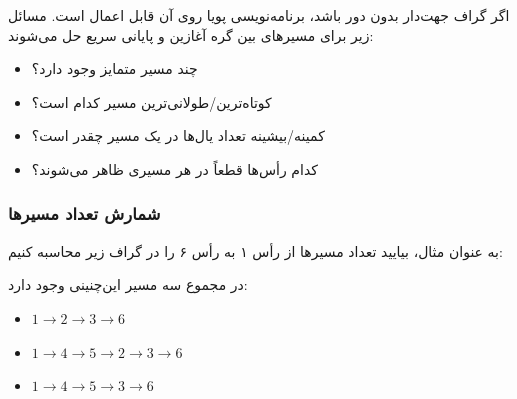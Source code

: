 اگر گراف جهت‌دار بدون دور باشد،
برنامه‌نویسی پویا روی آن قابل اعمال است.
مسائل زیر برای مسیرهای بین گره آغازین
و پایانی سریع حل می‌شوند:

\begin{itemize}
\item چند مسیر متمایز وجود دارد؟
\item کوتاه‌ترین/طولانی‌ترین مسیر کدام است؟
\item کمینه/بیشینه تعداد یال‌ها در یک مسیر چقدر است؟
\item کدام رأس‌ها قطعاً در هر مسیری ظاهر می‌شوند؟
\end{itemize}

\subsubsection{شمارش تعداد مسیرها}

به عنوان مثال، بیایید تعداد مسیرها از رأس ۱ به رأس ۶ را در گراف زیر محاسبه کنیم:

\begin{center}
\end{center}
در مجموع سه مسیر این‌چنینی وجود دارد:
\begin{itemize}
\item $1 \rightarrow 2 \rightarrow 3 \rightarrow 6$
\item $1 \rightarrow 4 \rightarrow 5 \rightarrow 2 \rightarrow 3 \rightarrow 6$
\item $1 \rightarrow 4 \rightarrow 5 \rightarrow 3 \rightarrow 6$
\end{itemize}

